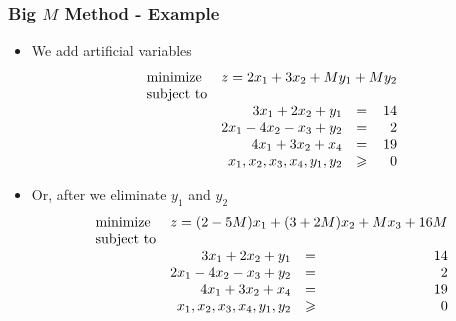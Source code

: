 \documentclass{beamer}
\theoremstyle{plain}
\let\ge\geqslant
\begin{document}
\begin{frame}\frametitle{Big $ M $ Method - Example}
\justifying

\begin{itemize}
\justifying

\item We add artificial variables 
\[ \begin{array}{lrcr}
\textrm{minimize} & \multicolumn{3}{c}{z = 2x_1 + 3x_2+ M y_1 + My_2}  \\
\textrm{subject to} & \\
& 3x_1 + 2x_2 + y_1& = & 14 \\
& 2x_1 - 4x_2 - x_3 + y_2 & = & 2 \\
& 4x_1 + 3x_2 + x_4 & = & 19 \\
& x_1, x_2, x_3, x_4, y_1, y_2 & \ge & 0
\end{array}
\]

\item Or, after we eliminate $ y_1 $ and $ y_2 $
\[ \begin{array}{lrcr}
\textrm{minimize} & \multicolumn{3}{c}{z = (2 - 5M)x_1 + (3 + 2M)x_2+ Mx_3+ 16M}  \\
\textrm{subject to} & \\
& 3x_1 + 2x_2 + y_1& = & 14 \\
& 2x_1 - 4x_2 - x_3 + y_2 & = & 2 \\
& 4x_1 + 3x_2 + x_4 & = & 19 \\
& x_1, x_2, x_3, x_4, y_1, y_2 & \ge & 0
\end{array}
\]
\end{itemize}

\end{frame}
\end{document}
